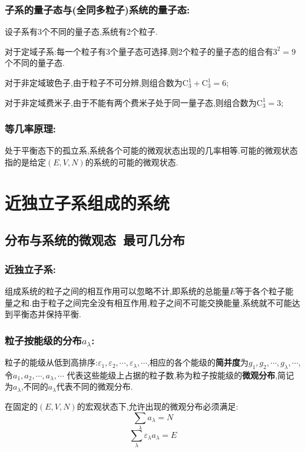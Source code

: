 \documentclass[12pt]{ctexart}
\numberwithin{equation}{subsection}
\begin{document}
	\subsubsection{ 子系的量子态与(全同多粒子)系统的量子态:}
		设子系有3个不同的量子态,系统有2个粒子.

		对于定域子系:每一个粒子有3个量子态可选择,则2个粒子的量子态的组合有$3^2=9$个不同的量子态.

		对于非定域玻色子,由于粒子不可分辨,则组合数为${\text{C}}_3^1 + {\text{C}}_3^1=6$;

		对于非定域费米子,由于不能有两个费米子处于同一量子态,则组合数为${\text{C}}_3^1=3$;

	\subsubsection{ 等几率原理:}
	处于平衡态下的孤立系,系统各个可能的微观状态出现的几率相等.可能的微观状态指的是给定$(E,V,N)$的系统的可能的微观状态. 	
\section{近独立子系组成的系统}
\subsection{分布与系统的微观态\ 最可几分布}
	\subsubsection{ 近独立子系:}
		组成系统的粒子之间的相互作用可以忽略不计,即系统的总能量$E$等于各个粒子能量之和.由于粒子之间完全没有相互作用,粒子之间不可能交换能量,系统就不可能达到平衡态并保持平衡.

	\subsubsection{ 粒子按能级的分布\texorpdfstring{$a_\lambda$}.:}
		粒子的能级从低到高排序:${\varepsilon _1},{\varepsilon _2}, \cdots ,{\varepsilon _\lambda }, \cdots $,相应的各个能级的\textbf{简并度}为${g_1},{g_2}, \cdots ,{g_\lambda }, \cdots $,令${a_1},{a_2}, \cdots ,{a_\lambda }, \cdots $ 代表这些能级上占据的粒子数,称为粒子按能级的\textbf{微观分布},简记为{$a_\lambda$},不同的{$a_\lambda$}代表不同的微观分布.

		在固定的$(E,V,N)$的宏观状态下,允许出现的微观分布必须满足:
		\begin{equation}
			\sum\limits_\lambda  {{a_\lambda }}  = N\label{7.1.1}
		\end{equation}
		\begin{equation}
			\sum\limits_\lambda  {{\varepsilon _\lambda }{a_\lambda }}  = E\label{7.1.2}
		\end{equation}
\end{document}
